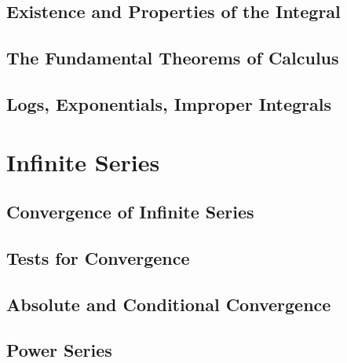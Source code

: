 \documentclass[12pt]{book}
\begin{document}
\section{Existence and Properties of the Integral}


\section{The Fundamental Theorems of Calculus}

\section{Logs, Exponentials, Improper Integrals}


\chapter{Infinite Series}

\section{Convergence of Infinite Series}


\section{Tests for Convergence}


\section{Absolute and Conditional Convergence}


\section{Power Series}
\end{document}
